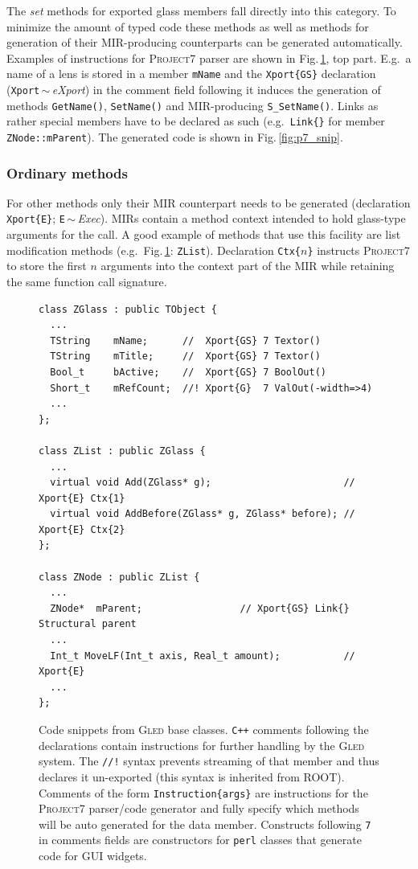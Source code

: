 \documentclass[final]{siamltex}
\def\gled{\textsc{Gled}\xspace}
\def\p7{\textsc{Project7}\xspace}
\def\smalltt#1{{\small\texttt{#1}}}
\def\foottt#1{{\footnotesize\texttt{#1}}}
\begin{document}
The \emph{set} methods for exported glass members fall directly into
this category. To minimize the amount of typed code these methods as
well as methods for generation of their MIR-producing counterparts can
be generated automatically. Examples of instructions for \p7 parser
are shown in Fig.\,\ref{fig:base_snip}, top part. E.g.\ a name of a lens
is stored in a member \smalltt{mName} and the \smalltt{Xport\{GS\}}
declaration (\smalltt{Xport}\,$\sim$\,\emph{eXport}) in the comment
field following it induces the generation of methods
\smalltt{GetName()}, \smalltt{SetName()} and MIR-producing
\smalltt{S\_SetName()}. Links as rather special members have to be
declared as such (e.g.\ \smalltt{Link\{\}} for member
\smalltt{ZNode::mParent}). The generated code is shown in
Fig.\,\ref{fig:p7_snip}.

\subsubsection{Ordinary methods}

For other methods only their MIR counterpart needs to be generated
(declaration \smalltt{Xport\{E\}}; \smalltt{E}\,$\sim$\,\emph{Exec}).
MIRs contain a method context intended to hold glass-type arguments
for the call. A good example of methods that use this facility are
list modification methods (e.g.\ Fig.\,\ref{fig:base_snip}:
\smalltt{ZList}).  Declaration \smalltt{Ctx\{{\footnotesize $n$}\}}
instructs \p7 to store the first $n$ arguments into the context part of the
MIR while retaining the same function call signature.

\begin{figure}
\centering
\scriptsize
\begin{verbatim}
class ZGlass : public TObject {
  ...
  TString    mName;      //  Xport{GS} 7 Textor()
  TString    mTitle;     //  Xport{GS} 7 Textor()
  Bool_t     bActive;    //  Xport{GS} 7 BoolOut()
  Short_t    mRefCount;  //! Xport{G}  7 ValOut(-width=>4)
  ...
};

class ZList : public ZGlass {
  ...
  virtual void Add(ZGlass* g);                       // Xport{E} Ctx{1}
  virtual void AddBefore(ZGlass* g, ZGlass* before); // Xport{E} Ctx{2}
};

class ZNode : public ZList {
  ...
  ZNode*  mParent;                 // Xport{GS} Link{} Structural parent
  ...
  Int_t MoveLF(Int_t axis, Real_t amount);           // Xport{E}
  ...
};
\end{verbatim}  
  \caption{Code snippets from \gled base classes. 
    \foottt{C++} comments following the declarations contain
    instructions for further handling by the \gled system. The
    \foottt{//!} syntax prevents streaming of that member and thus
    declares it un-exported (this syntax is inherited from ROOT).
    Comments of the form \foottt{Instruction\{args\}} are instructions
    for the \p7 parser/code generator and fully specify which methods
    will be auto generated for the data member. Constructs following
    \foottt{7} in comments fields are constructors for \foottt{perl}
    classes that generate code for GUI widgets.}
  \label{fig:base_snip}
\end{figure}
\end{document}
